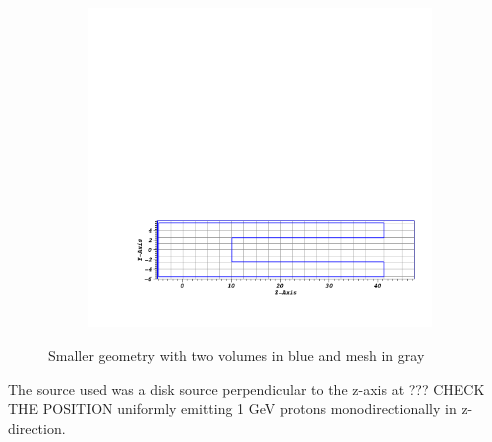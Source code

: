 \begin{figure}[!h]
\begin{subfigure}{1\textwidth}
        \includegraphics[scale=0.4, trim={4cm 3cm 1cm 22cm}, clip]{figs/mesh_geom_mesh.png}
        \caption{}
        \label{fig:smaller_geom2}
    \end{subfigure}
    \caption{Smaller geometry with two volumes in blue and mesh in gray}
    \label{fig:smaller_geom}
\end{figure}
%
The source used was a disk source perpendicular to the z-axis at ???
CHECK THE POSITION 
uniformly emitting 1 GeV protons monodirectionally in z-direction.
